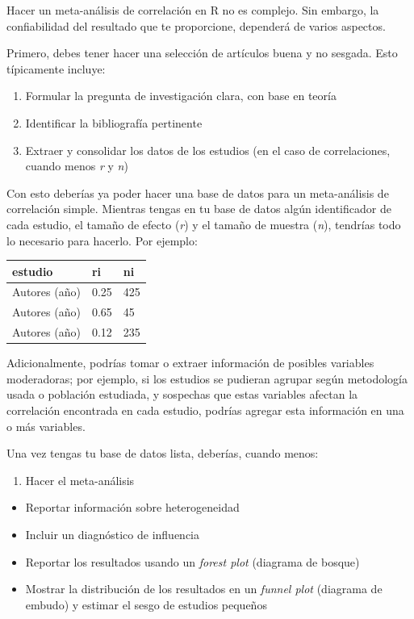 \documentclass[
  bookmarksnumbered]{article}
\providecommand{\tightlist}{%
  \setlength{\itemsep}{0pt}\setlength{\parskip}{0pt}}
\begin{document}
Hacer un meta-análisis de correlación en R no es complejo. Sin embargo, la confiabilidad del resultado que te proporcione, dependerá de varios aspectos.

Primero, debes tener hacer una selección de artículos buena y no sesgada. Esto típicamente incluye:

\begin{enumerate}
\def\labelenumi{\arabic{enumi})}
\item
  Formular la pregunta de investigación clara, con base en teoría
\item
  Identificar la bibliografía pertinente
\item
  Extraer y consolidar los datos de los estudios (en el caso de correlaciones, cuando menos \emph{r} y \emph{n})
\end{enumerate}

Con esto deberías ya poder hacer una base de datos para un meta-análisis de correlación simple. Mientras tengas en tu base de datos algún identificador de cada estudio, el tamaño de efecto (\emph{r}) y el tamaño de muestra (\emph{n}), tendrías todo lo necesario para hacerlo. Por ejemplo:

\begin{longtable}[]{@{}lll@{}}
\toprule()
estudio & ri & ni \\
\midrule()
\endhead
Autores (año) & 0.25 & 425 \\
Autores (año) & 0.65 & 45 \\
Autores (año) & 0.12 & 235 \\
\bottomrule()
\end{longtable}

Adicionalmente, podrías tomar o extraer información de posibles variables moderadoras; por ejemplo, si los estudios se pudieran agrupar según metodología usada o población estudiada, y sospechas que estas variables afectan la correlación encontrada en cada estudio, podrías agregar esta información en una o más variables.

Una vez tengas tu base de datos lista, deberías, cuando menos:

\begin{enumerate}
\def\labelenumi{\arabic{enumi}.}
\tightlist
\item
  Hacer el meta-análisis
\end{enumerate}

\begin{itemize}
\item
  Reportar información sobre heterogeneidad
\item
  Incluir un diagnóstico de influencia
\item
  Reportar los resultados usando un \emph{forest plot} (diagrama de bosque)
\item
  Mostrar la distribución de los resultados en un \emph{funnel plot} (diagrama de embudo) y estimar el sesgo de estudios pequeños
\end{itemize}
\end{document}
